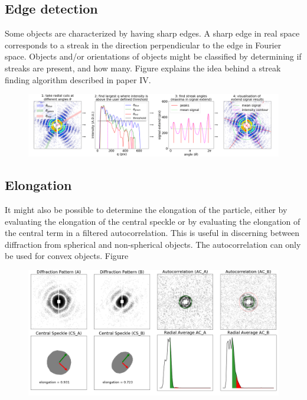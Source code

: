 \subsection{Edge detection}
Some objects are characterized by having sharp edges. A sharp edge in real space corresponds to a streak in the direction perpendicular to the edge in Fourier space. Objects and/or orientations of objects might be classified by determining if streaks are present, and how many. Figure explains the idea behind a streak finding algorithm described in paper IV.

\begin{figure}[h]
\centering
\includegraphics[width=120mm]{Chapter_08_ImageClassification_Edge_Detection.png}
\caption{}\label{fig:edge_detection}
\end{figure}

 
\subsection{Elongation}

It might also be possible to determine the elongation of the particle, either by evaluating the elongation of the central speckle \cite{Hantke2014,Daurer2017} or by evaluating the elongation of the central term in a filtered autocorrelation. This is useful in discerning between diffraction from spherical and non-spherical objects. The autocorrelation can only be used for convex objects. Figure 

\begin{figure}[h]
\centering
\includegraphics[width=120mm]{Chapter_08_ImageClassification_shape_assessment.png}
\caption{}\label{fig:shape_assessment}
\end{figure}


